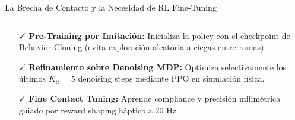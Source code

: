 \begin{frame}{La Brecha de Contacto y la Necesidad de RL Fine-Tuning}
\begin{columns}[T, onlytextwidth]
    \begin{column}{0.485\textwidth}
      \begin{tcolorbox}[
        enhanced,
        colback=AgriGreenLight,
        colframe=AgriGreen,
        arc=\CardArc,
        boxrule=\CardRule,
        height=\CardHeightDouble,
        title={\CardTitleFont La Solución Híbrida: DPPO \cite{ren2025dppo}},
        colbacktitle=AgriGreen,
        coltitle=WhiteBg,
        top=1.2mm, bottom=1.2mm, left=1.8mm, right=1.8mm
      ]
        {\BodyFont
        \begin{itemize}\setlength{\itemsep}{1.8pt}
          \item[\textcolor{AgriGreen}{\textbf{$\checkmark$}}] \textbf{Pre-Training por Imitación:} Inicializa la policy con el checkpoint de Behavior Cloning (evita exploración aleatoria a ciegas entre ramas).
          \item[\textcolor{AgriGreen}{\textbf{$\checkmark$}}] \textbf{Refinamiento sobre Denoising MDP:} Optimiza selectivamente los últimos $K_{\text{ft}} = 5$ denoising steps mediante PPO en simulación física.
          \item[\textcolor{AgriGreen}{\textbf{$\checkmark$}}] \textbf{Fine Contact Tuning:} Aprende compliance y precisión milimétrica guiado por reward shaping háptico a 20 Hz.
        \end{itemize}}
      \end{tcolorbox}
    \end{column}
  \end{columns}
\end{frame}

